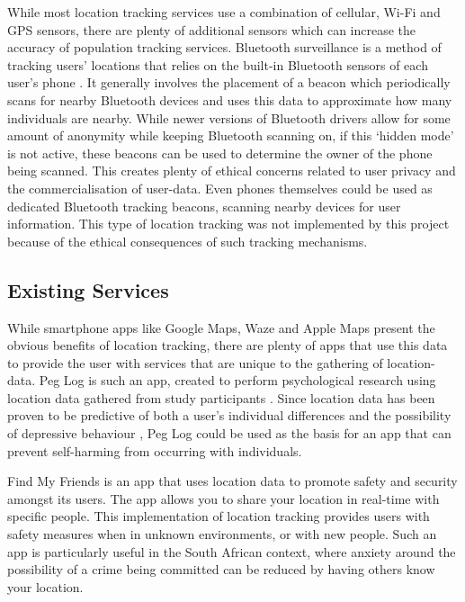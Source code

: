 While most location tracking services use a combination of cellular, Wi-Fi and GPS sensors, there are plenty of additional sensors which can increase the accuracy of population tracking services. Bluetooth surveillance is a method of tracking users' locations that relies on the built-in Bluetooth sensors of each user's phone \cite{BLE2004}. It generally involves the placement of a beacon which periodically scans for nearby Bluetooth devices and uses this data to approximate how many individuals are nearby. While newer versions of Bluetooth drivers allow for some amount of anonymity while keeping Bluetooth scanning on, if this `hidden mode' is not active, these beacons can be used to determine the owner of the phone being scanned. This creates plenty of ethical concerns related to user privacy and the commercialisation of user-data. Even phones themselves could be used as dedicated Bluetooth tracking beacons, scanning nearby devices for user information. This type of location tracking was not implemented by this project because of the ethical consequences of such tracking mechanisms.

\subsection{Existing Services}
While smartphone apps like Google Maps, Waze and Apple Maps present the obvious benefits of location tracking, there are plenty of apps that use this data to provide the user with services that are unique to the gathering of location-data. Peg Log is such an app, created to perform psychological research using location data gathered from study participants \cite{Geyer2019}. Since location data has been proven to be predictive of both a user's individual differences \cite{Chorley2015} and the possibility of depressive behaviour \cite{Saeb2016}, Peg Log could be used as the basis for an app that can prevent self-harming from occurring with individuals.

Find My Friends is an app that uses location data to promote safety and security amongst its users. The app allows you to share your location in real-time with specific people. This implementation of location tracking provides users with safety measures when in unknown environments, or with new people. Such an app is particularly useful in the South African context, where anxiety around the possibility of a crime being committed can be reduced by having others know your location.

